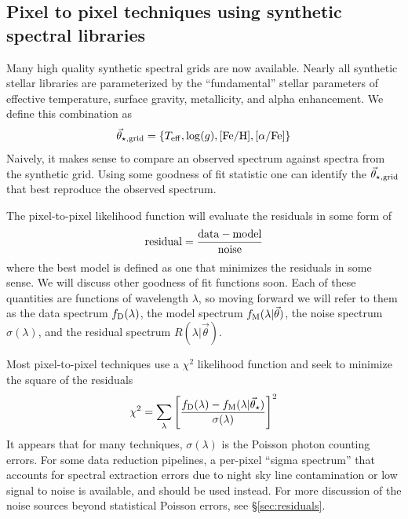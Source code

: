 \documentclass[preprint]{aastex} %
\newcommand{\vt}{\vec{\theta}}
\newcommand{\vg}{\vt_{\star, {\rm grid}}}
\newcommand{\vstar}{\vt_{\star}}
\newcommand{\fM}{f_{\rm M}}
\newcommand{\fD}{f_{\rm D}}
\newcommand{\Z}{[{\rm Fe}/{\rm H}]}
\newcommand{\A}{[\alpha/{\rm Fe}]}
\begin{document}
\subsection{Pixel to pixel techniques using synthetic spectral libraries}
\label{sec:pix}
Many high quality synthetic spectral grids are now available. Nearly all synthetic stellar libraries are parameterized by the ``fundamental'' stellar parameters of effective temperature, surface gravity, metallicity, and alpha enhancement. We define this combination as 
\begin{equation}
  \vg = \{T_{\rm eff}, \log(g), \Z, \A \}
\end{equation}
Naively, it makes sense to compare an observed spectrum against spectra from the synthetic grid. Using some goodness of fit statistic one can identify the $\vg$ that best reproduce the observed spectrum. 

The pixel-to-pixel likelihood function will evaluate the residuals in some form of 
\begin{equation}
  {\rm residual} = \frac{ {\rm data} - {\rm model}}{ {\rm noise}}
\end{equation}
where the best model is defined as one that minimizes the residuals in some sense. We will discuss other goodness of fit functions soon. Each of these quantities are functions of wavelength $\lambda$, so moving forward we will refer to them as the data spectrum $\fD(\lambda)$, the model spectrum $\fM(\lambda | \vt)$, the noise spectrum $\sigma(\lambda)$, and the residual spectrum $R(\lambda | \vt)$.

Most pixel-to-pixel techniques use a $\chi^2$ likelihood function and seek to minimize the square of the residuals
\begin{equation}
  \chi^2 = \sum_\lambda \left [\frac{ \fD(\lambda) - \fM(\lambda | \vstar) }{\sigma(\lambda)} \right ]^2
\end{equation}
It appears that for many techniques, $\sigma(\lambda)$ is the Poisson photon counting errors. For some data reduction pipelines, a per-pixel ``sigma spectrum'' that accounts for spectral extraction errors due to night sky line contamination or low signal to noise is available, and should be used instead. For more discussion of the noise sources beyond statistical Poisson errors, see \S\ref{sec:residuals}.
\end{document}
